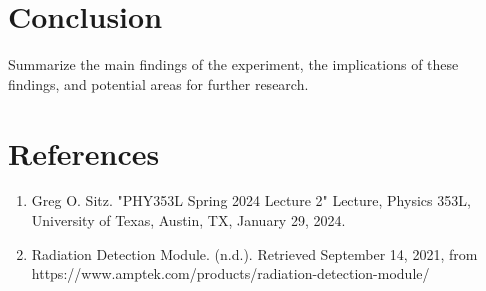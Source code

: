 \documentclass[12pt]{article}
\begin{document}
\section{Conclusion}
    Summarize the main findings of the experiment, the implications of these findings, and potential areas for further research.

\section{References}
    \begin{enumerate}
        \item Greg O. Sitz. "PHY353L Spring 2024 Lecture 2" Lecture, Physics 353L, University of Texas, Austin, TX, January 29, 2024.
        \item Radiation Detection Module. (n.d.). Retrieved September 14, 2021, from https://www.amptek.com/products/radiation-detection-module/
    \end{enumerate}
\end{document}
